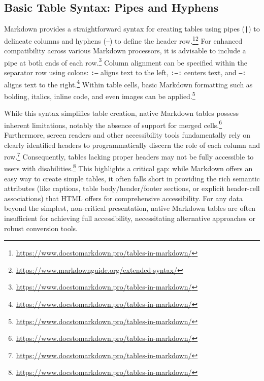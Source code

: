 \subsection{Basic Table Syntax: Pipes and Hyphens}
Markdown provides a straightforward syntax for creating tables using pipes (\texttt{|}) to delineate columns and hyphens (\texttt{---}) to define the header row.\footnote{\url{https://www.docstomarkdown.pro/tables-in-markdown/}}\footnote{\url{https://www.markdownguide.org/extended-syntax/}} For enhanced compatibility across various Markdown processors, it is advisable to include a pipe at both ends of each row.\footnote{\url{https://www.docstomarkdown.pro/tables-in-markdown/}} Column alignment can be specified within the separator row using colons: \texttt{:---} aligns text to the left, \texttt{:---:} centers text, and \texttt{---:} aligns text to the right.\footnote{\url{https://www.docstomarkdown.pro/tables-in-markdown/}} Within table cells, basic Markdown formatting such as bolding, italics, inline code, and even images can be applied.\footnote{\url{https://www.docstomarkdown.pro/tables-in-markdown/}}

While this syntax simplifies table creation, native Markdown tables possess inherent limitations, notably the absence of support for merged cells.\footnote{\url{https://www.docstomarkdown.pro/tables-in-markdown/}} Furthermore, screen readers and other accessibility tools fundamentally rely on clearly identified headers to programmatically discern the role of each column and row.\footnote{\url{https://www.docstomarkdown.pro/tables-in-markdown/}} Consequently, tables lacking proper headers may not be fully accessible to users with disabilities.\footnote{\url{https://www.docstomarkdown.pro/tables-in-markdown/}} This highlights a critical gap: while Markdown offers an easy way to create simple tables, it often falls short in providing the rich semantic attributes (like captions, table body/header/footer sections, or explicit header-cell associations) that HTML offers for comprehensive accessibility. For any data beyond the simplest, non-critical presentation, native Markdown tables are often insufficient for achieving full accessibility, necessitating alternative approaches or robust conversion tools.

